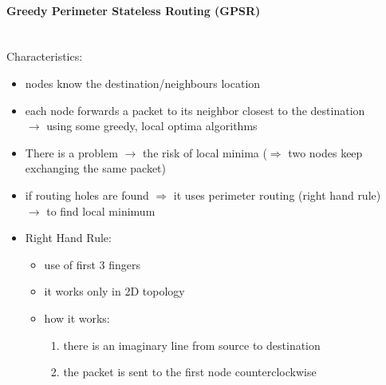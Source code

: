 \paragraph{Greedy Perimeter Stateless Routing (GPSR)}\mbox{}\\[0.2cm]
Characteristics:
\begin{itemize}
    \item nodes know the destination/neighbours location
    \item each node forwards a packet to its neighbor closest to the destination\\
    $\rightarrow$ using some greedy, local optima algorithms
    \item There is a problem $\rightarrow$ the risk of
    local minima ($\Rightarrow$ two nodes keep exchanging the same packet)
    \item if routing holes are found $\Rightarrow$ it uses perimeter routing (right hand rule)\\
    $\rightarrow$ to find local minimum
    \item Right Hand Rule:
    \begin{itemize}
        \item use of first 3 fingers
        \item it works only in 2D topology
        \item how it works:
        \begin{enumerate}
            \item there is an imaginary line from source to destination
            \item the packet is sent to the first node counterclockwise
        \end{enumerate}
    \end{itemize}
\end{itemize}
